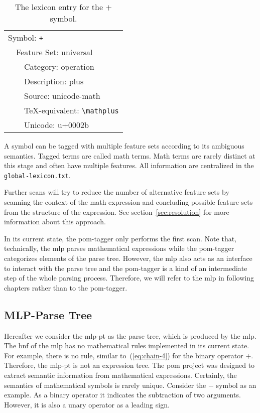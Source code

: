 \begin{table}[ht]
	\centering
	\begin{tabular}{lll}
	\hline
	\multicolumn{3}{l}{Symbol: \texttt{+}} \\
	\! & \multicolumn{2}{l}{Feature Set: universal} \\
	\! & \! & Category: operation\\
	\! & \! & Description: plus\\
	\! & \! & Source: unicode-math\\
	\! & \! & \TeX-equivalent: \verb|\mathplus|\\
	\! & \! & Unicode: u+0002b\\
	\hline
	\end{tabular}
	\caption{The lexicon entry for the $+$ symbol.}
	\label{tab:plus-lex-example}
\end{table}

A symbol can be tagged with multiple feature sets according to its ambiguous semantics. Tagged terms are called math terms. Math terms are rarely distinct at this stage and often have multiple features. All information are centralized in the \verb|global-lexicon.txt|.

Further scans will try to reduce the number of alternative feature sets by scanning the context of the math expression and concluding possible feature sets from the structure of the expression. See section~\ref{sec:resolution} for more information about this approach.

In its current state, the \gls{pom}-tagger only performs the first scan. Note that, technically, the \gls{mlp} parses mathematical expressions while the \gls{pom}-tagger categorizes elements of the parse tree. However, the \gls{mlp} also acts as an interface to interact with the parse tree and the \gls{pom}-tagger is a kind of an intermediate step of the whole parsing process. Therefore, we will refer to the \gls{mlp} in following chapters rather than to the \gls{pom}-tagger.

\subsection{MLP-Parse Tree}\label{subsec:mlp-syntax-tree}
Hereafter we consider the \gls{mlp-pt} as the parse tree, which is produced by the \gls{mlp}. The \gls{bnf} of the \gls{mlp} has no mathematical rules implemented in its current state. For example, there is no rule, similar to~(\ref{eq:chain-4}) for the binary operator $+$. Therefore, the \gls{mlp-pt} is not an expression tree. The \gls{pom} project was designed to extract semantic information from mathematical expressions. Certainly, the semantics of mathematical symbols is rarely unique. Consider the $-$ symbol as an example. As a binary operator it indicates the subtraction of two arguments. However, it is also a unary operator as a leading sign.

